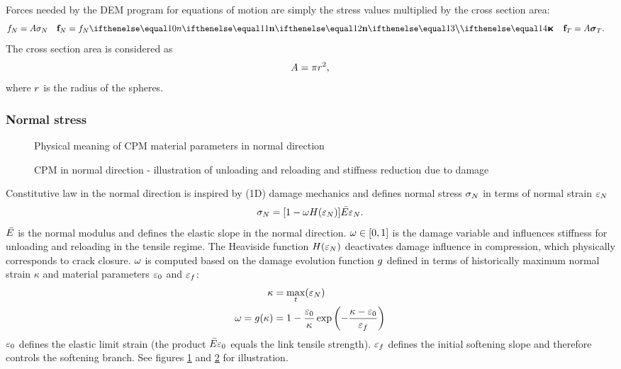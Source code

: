 Forces needed by the DEM program for equations of motion are simply the stress values multiplied by the cross section area:
\begin{align}
	\force_\normalComponent &= \linkCrossSectionArea\linkStressNormal
	&
	\forceVector_\normalComponent &= \force_\normalComponent\normalVector
	&
	\forceVector_\shearComponent &= \linkCrossSectionArea\linkStressShearVector
	.
\end{align}
The cross section area is considered as
\begin{equation}
	A = \pi r^2
	,
\end{equation}
where $r$ is the radius of the spheres.


\subsubsection{Normal stress}

\begin{figure}[htb]
	\centering
	\caption{Physical meaning of CPM material parameters in normal direction}
	\label{figCpmStressStrainNormal}
\end{figure}

\begin{figure}[hbt]
	\centering
	\caption[CPM in normal direction]{CPM in normal direction - illustration of unloading and reloading and stiffness reduction due to damage}
	\label{figCpmStressStrainNormalCyclic}
\end{figure}

Constitutive law in the normal direction is inspired by (1D) damage mechanics and
defines normal stress $\sigma_N$ in terms of normal strain $\varepsilon_N$
\begin{align}
	\linkStressNormal = [1-\damage H(\linkStrainNormal)]\linkMaterialStiffnessNormal\linkStrainNormal
	.
\end{align}
$\linkMaterialStiffnessNormal$ is the normal modulus and defines the elastic slope in the normal direction.
$\omega\in[0,1]$ is the damage variable and influences stiffness for unloading and reloading in the tensile regime.
The Heaviside function $H(\varepsilon_N)$ deactivates damage influence in compression, which physically corresponds to
crack closure.
$\omega$ is computed based on the damage evolution function $g$ defined in terms of historically maximum normal strain $\kappa$ and material parameters $\varepsilon_0$ and $\varepsilon_f$:
\begin{align}
	\kappa &= \max_t(\varepsilon_N)
	\\
	\omega = g(\kappa) &= 1-\frac{\varepsilon_0}{\kappa}\exp\left(-\frac{\kappa-\varepsilon_0}{\varepsilon_f}\right)
\end{align}
$\varepsilon_0$ defines the elastic limit strain (the product $\linkMaterialStiffnessNormal\strainO$ equals the link tensile strength).
$\varepsilon_f$ defines the initial softening slope and therefore controls the softening branch.
See figures \ref{figCpmStressStrainNormal} and \ref{figCpmStressStrainNormalCyclic} for illustration.




